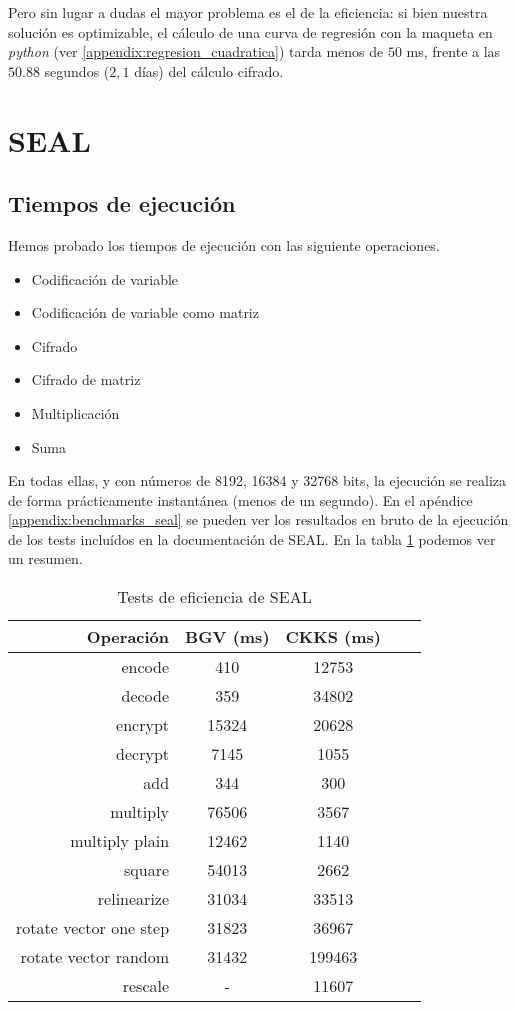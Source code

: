 Pero sin lugar a dudas el mayor problema es el de la eficiencia: si bien nuestra solución es optimizable, el cálculo de una curva de regresión con la maqueta en \textit{python} (ver \ref{appendix:regresion_cuadratica}) tarda menos de $50$ ms, frente a las $50.88$ segundos ($2,1$ días) del cálculo cifrado.

\section{SEAL}

\subsection{Tiempos de ejecución}

Hemos probado los tiempos de ejecución con las siguiente operaciones.

\begin{itemize}
    \item Codificación de variable
    \item Codificación de variable como matriz
    \item Cifrado
    \item Cifrado de matriz
    \item Multiplicación
    \item Suma
\end{itemize}

En todas ellas, y con números de 8192, 16384 y 32768 bits, la ejecución se realiza de forma prácticamente instantánea (menos de un segundo). En el apéndice \ref{appendix:benchmarks_seal} se pueden ver los resultados en bruto de la ejecución de los tests incluídos en la documentación de SEAL. En la tabla \ref{table:benchmarks_seal} podemos ver un resumen.

\begin{table}[]
    \centering
    \begin{tabular}{r | c c c c}
        Operación   & BGV (ms) & CKKS (ms)  \\
        \hline \hline
        encode  & 410  & 12753 \\
        decode  & 359  & 34802 \\
        encrypt & 15324 & 20628 \\
        decrypt & 7145  & 1055 \\
        add & 344 & 300 \\
        multiply  & 76506  & 3567 \\
        multiply plain  & 12462  & 1140 \\
        square  & 54013  & 2662 \\
        relinearize & 31034 & 33513 \\
        rotate vector one step  & 31823  & 36967 \\
        rotate vector random  & 31432  & 199463 \\
        rescale  & - & 11607
    \end{tabular}
    \caption{Tests de eficiencia de SEAL}
    \label{table:benchmarks_seal}
\end{table}

